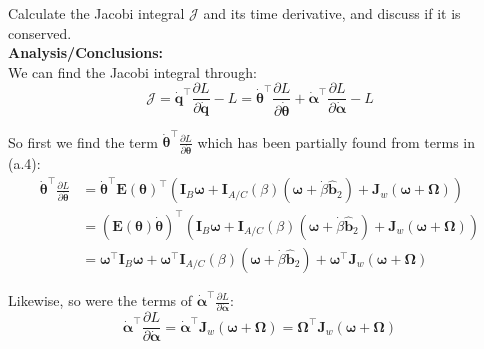 \documentclass[titlepage]{article}
\begin{document}
Calculate the Jacobi integral $\mathcal{J}$ and its time derivative, and discuss if it is conserved. \\

\textbf{Analysis/Conclusions:}\\

We can find the Jacobi integral through:
\begin{equation}
	\mathcal{J}=\dot{\boldsymbol{q}}^\top\frac{\partial L}{\partial\dot{\boldsymbol{q}}}-L=\dot{\boldsymbol{\theta}}^\top\frac{\partial L}{\partial\dot{\boldsymbol{\theta}}}+\dot{\boldsymbol{\alpha}}^\top\frac{\partial L}{\partial\dot{\boldsymbol{\alpha}}}-L
	\label{eq:jacobi}
\end{equation}

So first we find the term $\dot{\boldsymbol{\theta}}^\top\frac{\partial L}{\partial\dot{\boldsymbol{\theta}}}$ which has been partially found from terms in (a.4):
\begin{equation}
	\begin{split}
		\dot{\boldsymbol{\theta}}^\top\frac{\partial L}{\partial\dot{\boldsymbol{\theta}}}&=\dot{\boldsymbol{\theta}}^\top\boldsymbol{E}(\boldsymbol{\theta})^\top\left(\boldsymbol{I}_B\boldsymbol{\omega}+\boldsymbol{I}_{A/C}(\beta)\left(\boldsymbol{\omega}+\dot{\beta}\hat{\boldsymbol{b}}_2\right)+\boldsymbol{J}_w\left(\boldsymbol{\omega}+\boldsymbol{\Omega}\right)\right) \\
		&=\left(\boldsymbol{E}(\boldsymbol{\theta})\dot{\boldsymbol{\theta}}\right)^\top\left(\boldsymbol{I}_B\boldsymbol{\omega}+\boldsymbol{I}_{A/C}(\beta)\left(\boldsymbol{\omega}+\dot{\beta}\hat{\boldsymbol{b}}_2\right)+\boldsymbol{J}_w\left(\boldsymbol{\omega}+\boldsymbol{\Omega}\right)\right) \\
		&=\boldsymbol{\omega}^\top\boldsymbol{I}_B\boldsymbol{\omega}+\boldsymbol{\omega}^\top\boldsymbol{I}_{A/C}(\beta)\left(\boldsymbol{\omega}+\dot{\beta}\hat{\boldsymbol{b}}_2\right)+\boldsymbol{\omega}^\top\boldsymbol{J}_w\left(\boldsymbol{\omega}+\boldsymbol{\Omega}\right)
	\end{split}
\end{equation}

Likewise, so were the terms of $\dot{\boldsymbol{\alpha}}^\top\frac{\partial L}{\partial\dot{\boldsymbol{\alpha}}}$:
\begin{equation}
	\dot{\boldsymbol{\alpha}}^\top\frac{\partial L}{\partial\dot{\boldsymbol{\alpha}}}=\dot{\boldsymbol{\alpha}}^\top\boldsymbol{J}_w\left(\boldsymbol{\omega}+\boldsymbol{\Omega}\right)=\boldsymbol{\Omega}^\top\boldsymbol{J}_w\left(\boldsymbol{\omega}+\boldsymbol{\Omega}\right)
\end{equation}
\end{document}
